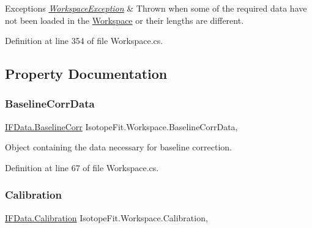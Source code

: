 \begin{DoxyExceptions}{Exceptions}
{\em \hyperlink{class_isotope_fit_1_1_workspace_exception}{Workspace\+Exception}} & Thrown when some of the required data have not been loaded in the \hyperlink{class_isotope_fit_1_1_workspace}{Workspace} or their lengths are different.\\
\hline
\end{DoxyExceptions}


Definition at line 354 of file Workspace.\+cs.



\subsection{Property Documentation}
\mbox{\label{class_isotope_fit_1_1_workspace_a700395fbb329b1a0fcb5932095db066f}} 
\subsubsection{\texorpdfstring{Baseline\+Corr\+Data}{BaselineCorrData}}
{\footnotesize\ttfamily \hyperlink{class_isotope_fit_1_1_i_f_data_1_1_baseline_corr}{I\+F\+Data.\+Baseline\+Corr} Isotope\+Fit.\+Workspace.\+Baseline\+Corr\+Data\hspace{0.3cm}{\ttfamily [get]}, {\ttfamily [set]}}



Object containing the data necessary for baseline correction. 



Definition at line 67 of file Workspace.\+cs.

\mbox{\label{class_isotope_fit_1_1_workspace_a0ed1cfd6701db24de84f4ba67eed0442}} 
\subsubsection{\texorpdfstring{Calibration}{Calibration}}
{\footnotesize\ttfamily \hyperlink{class_isotope_fit_1_1_i_f_data_1_1_calibration}{I\+F\+Data.\+Calibration} Isotope\+Fit.\+Workspace.\+Calibration\hspace{0.3cm}{\ttfamily [get]}, {\ttfamily [set]}}



